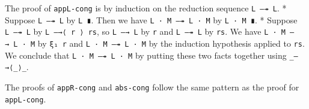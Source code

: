 The proof of \texttt{appL-cong} is by induction on the reduction
sequence \texttt{L\ —↠\ L\textquotesingle{}}. * Suppose
\texttt{L\ —↠\ L} by \texttt{L\ ∎}. Then we have
\texttt{L\ ·\ M\ —↠\ L\ ·\ M} by \texttt{L\ ·\ M\ ∎}. * Suppose
\texttt{L\ —↠\ L\textquotesingle{}\textquotesingle{}} by
\texttt{L\ —→⟨\ r\ ⟩\ rs}, so \texttt{L\ —→\ L\textquotesingle{}} by
\texttt{r} and
\texttt{L\textquotesingle{}\ —↠\ L\textquotesingle{}\textquotesingle{}}
by \texttt{rs}. We have \texttt{L\ ·\ M\ —→\ L\textquotesingle{}\ ·\ M}
by \texttt{ξ₁\ r} and
\texttt{L\textquotesingle{}\ ·\ M\ —↠\ L\textquotesingle{}\textquotesingle{}\ ·\ M}
by the induction hypothesis applied to \texttt{rs}. We conclude that
\texttt{L\ ·\ M\ —↠\ L\textquotesingle{}\textquotesingle{}\ ·\ M} by
putting these two facts together using \texttt{\_—→⟨\_⟩\_}.

The proofs of \texttt{appR-cong} and \texttt{abs-cong} follow the same
pattern as the proof for \texttt{appL-cong}.

